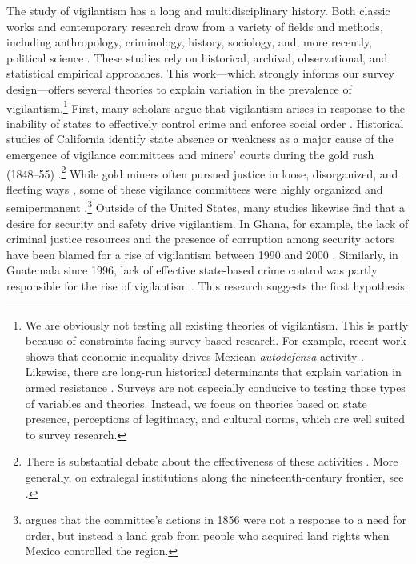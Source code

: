 \documentclass[12pt,ansiapaper]{article}
\begin{document}
The study of vigilantism has a long and multidisciplinary history. Both classic works and contemporary research draw from a variety of fields and methods, including anthropology, criminology, history, sociology, and, more recently, political science \citep{moncada2017varieties}. These studies rely on historical, archival, observational, and statistical empirical approaches. This work---which strongly informs our survey design---offers several theories to explain variation in the prevalence of vigilantism.\footnote{We are obviously not testing all existing theories of vigilantism. This is partly because of constraints facing survey-based research. For example,  recent work shows that economic inequality drives Mexican \textit{autodefensa} activity \citep{phillips2017inequality}. Likewise, there are  long-run historical determinants that explain variation in armed resistance \citep{Osorio2019mexico}. Surveys are not especially conducive to testing those types of variables and theories. Instead, we focus on theories based on state presence, perceptions of legitimacy, and cultural norms, which are well suited to survey research.}  First, many scholars argue that vigilantism arises in response to the inability of states to effectively control crime and enforce social order \citep{bancroft1887works}. Historical studies of California identify state absence or weakness as a major cause of the emergence of vigilance committees and miners' courts during the gold rush (1848--55) \citep{hunt1920committees,rohrbough1997days,couttenier2017wild}.\footnote{There is substantial debate about the effectiveness of these activities \citep{clay2003order}. More generally, on extralegal institutions along the nineteenth-century frontier, see \cite{murtazashvili2013political}.} While gold miners often pursued justice in loose, disorganized, and fleeting ways \citep{mcdowell2002commons,mcdowell2007criminal}, some of these vigilance committees were highly organized and semipermanent \citep{bancroft1887works}.\footnote{\citet{taniguchi2016dirty} argues that the committee's actions in 1856 were not a response to a need for order, but instead a land grab from people who acquired land rights when Mexico controlled the region.} Outside of the United States, many studies likewise find that a desire for security and safety drive vigilantism. In Ghana, for example, the lack of criminal justice resources and the presence of corruption among security actors have been blamed for a rise of vigilantism between 1990 and 2000 \citep[416]{adinkrah2005vigilante}. Similarly, in  Guatemala since 1996, lack of effective state-based crime control was partly responsible for the rise of vigilantism \citep{godoy2006popular}. This research suggests the first hypothesis:
\end{document}
